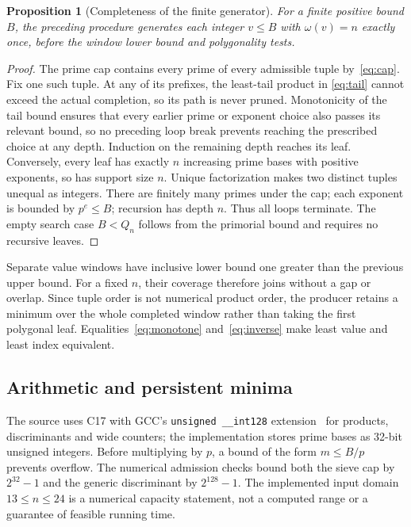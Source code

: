 \documentclass[11pt]{article}
\newtheorem{proposition}[theorem]{Proposition}
\theoremstyle{remark}
\begin{document}
\begin{proposition}[Completeness of the finite generator]\label{prop:generator}
For a finite positive bound $B$, the preceding procedure generates each
integer $v\leq B$ with $\omega(v)=n$ exactly once, before the window lower
bound and polygonality tests.
\end{proposition}
\begin{proof}
The prime cap contains every prime of every admissible tuple by~\eqref{eq:cap}.
Fix one such tuple. At any of its prefixes, the least-tail product in
\eqref{eq:tail} cannot exceed the actual completion, so its path is never
pruned. Monotonicity of the tail bound ensures that every earlier prime or
exponent choice also passes its relevant bound, so no preceding loop break
prevents reaching the prescribed choice at any depth. Induction on the remaining depth reaches its leaf.
Conversely, every leaf has exactly $n$ increasing prime bases with positive
exponents, so has support size $n$. Unique factorization makes two distinct
tuples unequal as integers. There are finitely many primes under the cap;
each exponent is bounded by $p^e\leq B$; recursion has depth $n$. Thus all
loops terminate. The empty search case $B<Q_n$ follows from the primorial
bound and requires no recursive leaves.
\end{proof}

Separate value windows have inclusive lower bound one greater than the
previous upper bound. For a fixed $n$, their coverage therefore joins without
a gap or overlap. Since tuple order is not numerical product order, the
producer retains a minimum over the whole completed window rather than
taking the first polygonal leaf. Equalities~\eqref{eq:monotone}
and~\eqref{eq:inverse} make least value and least index equivalent.

\subsection{Arithmetic and persistent minima}\label{sec:implementation}
The source uses C17 with GCC's \texttt{unsigned \_\_int128}
extension~\cite{gcc} for products, discriminants and wide counters; the
implementation stores prime bases as 32-bit unsigned integers. Before multiplying by $p$, a bound of the form
$m\leq B/p$ prevents overflow. The numerical admission checks bound both
the sieve cap by $2^{32}-1$ and the generic discriminant by $2^{128}-1$.
The implemented input domain $13\leq n\leq24$ is a numerical capacity
statement, not a computed range or a guarantee of feasible running time.
\end{document}
